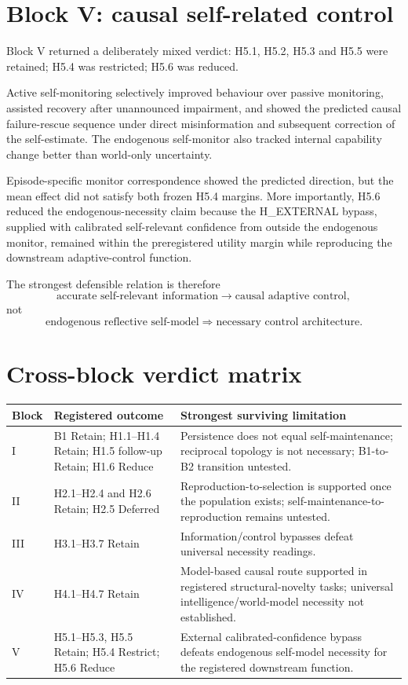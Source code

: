 \documentclass[11pt,a4paper]{article}
\begin{document}
\section{Block V: causal self-related control}

Block V returned a deliberately mixed verdict: H5.1, H5.2, H5.3 and H5.5 were retained; H5.4 was restricted; H5.6 was reduced.

Active self-monitoring selectively improved behaviour over passive monitoring, assisted recovery after unannounced impairment, and showed the predicted causal failure-rescue sequence under direct misinformation and subsequent correction of the self-estimate. The endogenous self-monitor also tracked internal capability change better than world-only uncertainty.

Episode-specific monitor correspondence showed the predicted direction, but the mean effect did not satisfy both frozen H5.4 margins. More importantly, H5.6 reduced the endogenous-necessity claim because the H\_EXTERNAL bypass, supplied with calibrated self-relevant confidence from outside the endogenous monitor, remained within the preregistered utility margin while reproducing the downstream adaptive-control function.

The strongest defensible relation is therefore
\[
\text{accurate self-relevant information}
\rightarrow
\text{causal adaptive control},
\]
not
\[
\text{endogenous reflective self-model}
\Rightarrow
\text{necessary control architecture}.
\]

\section{Cross-block verdict matrix}

\small
\begin{longtable}{p{.12\linewidth}p{.36\linewidth}p{.43\linewidth}}
\toprule
Block & Registered outcome & Strongest surviving limitation\\
\midrule
\endhead
I & B1 Retain; H1.1--H1.4 Retain; H1.5 follow-up Retain; H1.6 Reduce & Persistence does not equal self-maintenance; reciprocal topology is not necessary; B1-to-B2 transition untested.\\
II & H2.1--H2.4 and H2.6 Retain; H2.5 Deferred & Reproduction-to-selection is supported once the population exists; self-maintenance-to-reproduction remains untested.\\
III & H3.1--H3.7 Retain & Information/control bypasses defeat universal necessity readings.\\
IV & H4.1--H4.7 Retain & Model-based causal route supported in registered structural-novelty tasks; universal intelligence/world-model necessity not established.\\
V & H5.1--H5.3, H5.5 Retain; H5.4 Restrict; H5.6 Reduce & External calibrated-confidence bypass defeats endogenous self-model necessity for the registered downstream function.\\
\bottomrule
\end{longtable}
\normalsize
\end{document}
